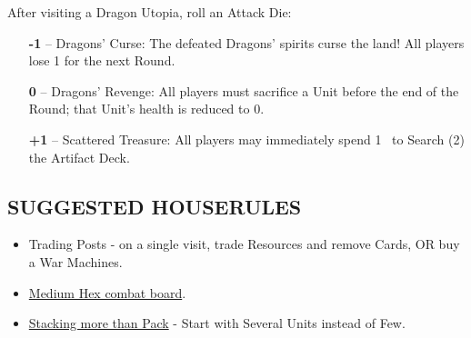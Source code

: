 \begin{multicols*}{2}
After visiting a Dragon Utopia, roll an Attack Die:
\begin{itemize}
  \item[\textbf{-1}] -- Dragons' Curse: The defeated Dragons’ spirits curse the land! All players lose 1  for the next Round.
  \item[\textbf{0}] -- Dragons' Revenge: All players must sacrifice a Unit before the end of the Round; that Unit's health is reduced to 0. 
  \item[ \textbf{+1}] -- Scattered Treasure: All players may immediately spend \mbox{1 } to Search (2) the Artifact Deck.
\end{itemize}

\subsection*{\MakeUppercase{Suggested Houserules}}
\begin{itemize}
  \item Trading Posts - on a single visit, trade Resources and remove Cards, OR buy a War Machines.
  \item \href{https://boardgamegeek.com/thread/3445901/custom-hex-combat-board}{Medium Hex combat board}.
  \item \href{https://boardgamegeek.com/thread/3449937/houserule-for-stacking-more-than-pack}{Stacking more than Pack} - Start with Several  Units instead of Few.
\end{itemize}

\vspace*{\fill}

\end{multicols*}

